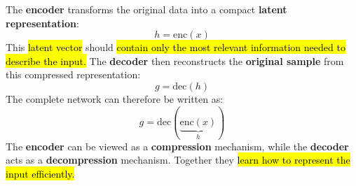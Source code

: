 \highspace
\textcolor{Green3}{} The \textbf{encoder} transforms the original data into a compact \textbf{latent representation}:
\begin{equation}\label{eq:auto-encoder}
    h = \mathrm{enc}(x)
\end{equation}
This \hl{latent vector} should \hl{contain only the most relevant information needed to describe the input.} \textcolor{Green3}{} The \textbf{decoder} then reconstructs the \textbf{original sample} from this compressed representation:
\begin{equation}\label{eq:auto-decoder}
    g = \mathrm{dec}(h)
\end{equation}
The complete network can therefore be written as:
\begin{equation}
    g = \mathrm{dec}(\underbrace{\mathrm{enc}(x)}_{h})
\end{equation}
The \textbf{encoder} can be viewed as a \textbf{compression} mechanism, while the \textbf{decoder} acts as a \textbf{decompression} mechanism. Together they \hl{learn how to represent the input efficiently.}

